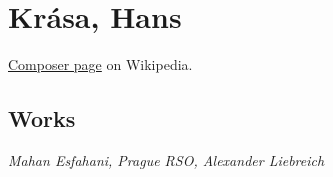 \chapter{Krása, Hans} %
\label{cha:krasa}

\href{https://en.wikipedia.org/wiki/Hans_Krása}{Composer page} on Wikipedia.

\section{Works}

\textit{Mahan Esfahani, Prague RSO, Alexander Liebreich} \\